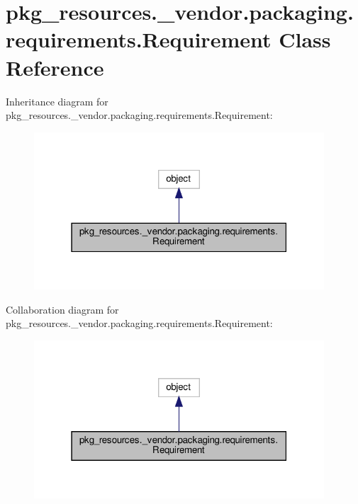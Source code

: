 \hypertarget{classpkg__resources_1_1__vendor_1_1packaging_1_1requirements_1_1Requirement}{}\section{pkg\+\_\+resources.\+\_\+vendor.\+packaging.\+requirements.\+Requirement Class Reference}
\label{classpkg__resources_1_1__vendor_1_1packaging_1_1requirements_1_1Requirement}


Inheritance diagram for pkg\+\_\+resources.\+\_\+vendor.\+packaging.\+requirements.\+Requirement\+:
\nopagebreak
\begin{figure}[H]
\begin{center}
\leavevmode
\includegraphics[width=307pt]{classpkg__resources_1_1__vendor_1_1packaging_1_1requirements_1_1Requirement__inherit__graph}
\end{center}
\end{figure}


Collaboration diagram for pkg\+\_\+resources.\+\_\+vendor.\+packaging.\+requirements.\+Requirement\+:
\nopagebreak
\begin{figure}[H]
\begin{center}
\leavevmode
\includegraphics[width=307pt]{classpkg__resources_1_1__vendor_1_1packaging_1_1requirements_1_1Requirement__coll__graph}
\end{center}
\end{figure}
